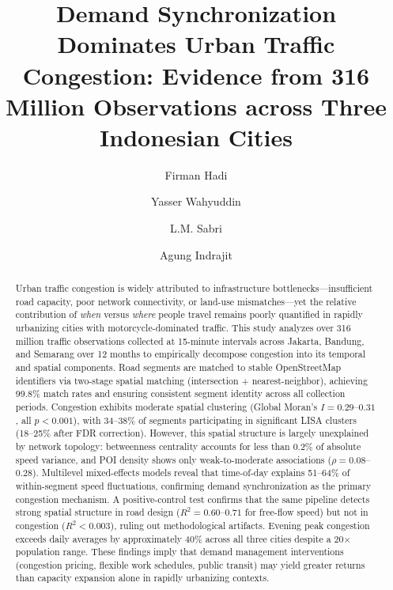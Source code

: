 \documentclass[review,authoryear]{elsarticle}
\begin{document}
\begin{frontmatter}

\title{Demand Synchronization Dominates Urban Traffic Congestion: Evidence from 316 Million Observations across Three Indonesian Cities}

\author[undip]{Firman Hadi}
\author[undip]{Yasser Wahyuddin}
\author[undip]{L.M. Sabri}
\author[nca]{Agung Indrajit}



\begin{abstract}
Urban traffic congestion is widely attributed to infrastructure bottlenecks---insufficient road capacity, poor network connectivity, or land-use mismatches---yet the relative contribution of \emph{when} versus \emph{where} people travel remains poorly quantified in rapidly urbanizing cities with motorcycle-dominated traffic. This study analyzes over 316 million traffic observations collected at 15-minute intervals across Jakarta, Bandung, and Semarang over 12 months to empirically decompose congestion into its temporal and spatial components. Road segments are matched to stable OpenStreetMap identifiers via two-stage spatial matching (intersection + nearest-neighbor), achieving 99.8\% match rates and ensuring consistent segment identity across all collection periods. Congestion exhibits moderate spatial clustering (Global Moran's $I = 0.29$--$0.31$, all $p < 0.001$), with 34--38\% of segments participating in significant LISA clusters (18--25\% after FDR correction). However, this spatial structure is largely unexplained by network topology: betweenness centrality accounts for less than 0.2\% of absolute speed variance, and POI density shows only weak-to-moderate associations ($\rho = 0.08$--$0.28$). Multilevel mixed-effects models reveal that time-of-day explains 51--64\% of within-segment speed fluctuations, confirming demand synchronization as the primary congestion mechanism. A positive-control test confirms that the same pipeline detects strong spatial structure in road design ($R^2 = 0.60$--$0.71$ for free-flow speed) but not in congestion ($R^2 < 0.003$), ruling out methodological artifacts. Evening peak congestion exceeds daily averages by approximately 40\% across all three cities despite a 20$\times$ population range. These findings imply that demand management interventions (congestion pricing, flexible work schedules, public transit) may yield greater returns than capacity expansion alone in rapidly urbanizing contexts.
\end{abstract}


\end{frontmatter}
\end{document}
